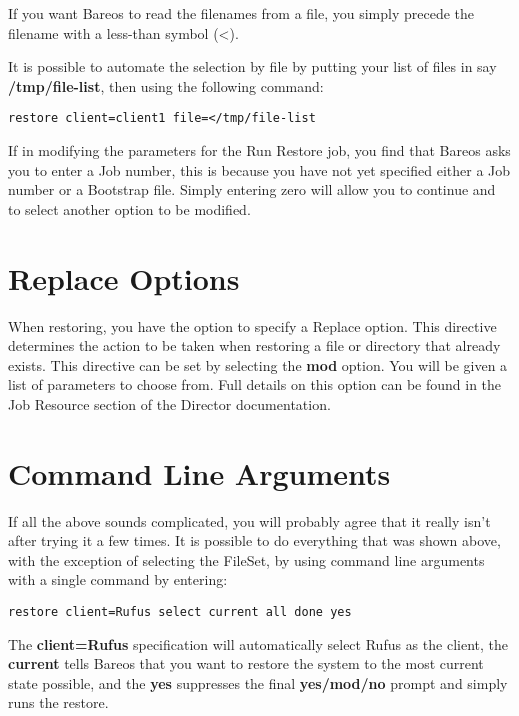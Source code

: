 If you want Bareos to read the filenames from a file, you simply precede the
filename with a less-than symbol ({\textless}).

It is possible to automate the selection by file by putting your list of files
in say {\bf /tmp/file-list}, then using the following command:

\footnotesize
\begin{verbatim}
restore client=client1 file=</tmp/file-list
\end{verbatim}
\normalsize

If in modifying the parameters for the Run Restore job, you find that Bareos
asks you to enter a Job number, this is because you have not yet specified
either a Job number or a Bootstrap file. Simply entering zero will allow you
to continue and to select another option to be modified.

\label{Replace}

\section{Replace Options}

When restoring, you have the option to specify a Replace option.  This
directive determines the action to be taken when restoring a file or
directory that already exists.  This directive can be set by selecting
the {\bf mod} option.  You will be given a list of parameters to choose
from.  Full details on this option can be found in the Job Resource section
of the Director documentation.


\section{Command Line Arguments}
\label{CommandArguments}

If all the above sounds complicated, you will probably agree that it really
isn't after trying it a few times. It is possible to do everything that was
shown above, with the exception of selecting the FileSet, by using command
line arguments with a single command by entering:

\footnotesize
\begin{verbatim}
restore client=Rufus select current all done yes
\end{verbatim}
\normalsize

The {\bf client=Rufus} specification will automatically select Rufus as the
client, the {\bf current} tells Bareos that you want to restore the system to
the most current state possible, and the {\bf yes} suppresses the final {\bf
yes/mod/no} prompt and simply runs the restore.

